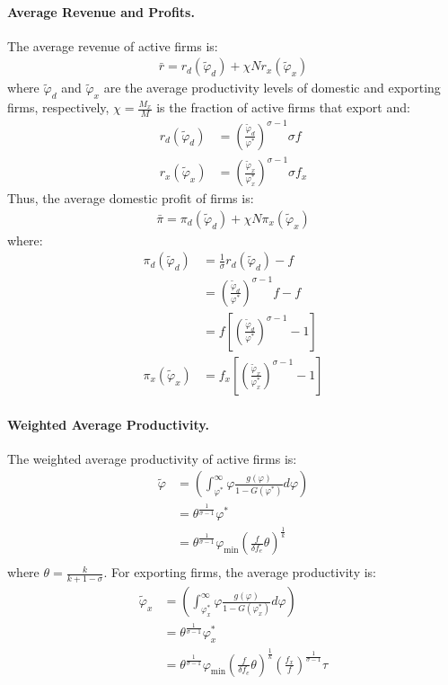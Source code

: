\begin{solution}
	\paragraph{Average Revenue and Profits.} The average revenue of active firms is:
	\begin{align*}
		\bar{r} = r_d(\tilde{\varphi}_d) + \chi N r_x(\tilde{\varphi}_x)
	\end{align*}
	where $\tilde{\varphi}_d$ and $\tilde{\varphi}_x$ are the average productivity levels of domestic and exporting firms, respectively,  $\chi = \frac{M_x}{M}$ is the fraction of active firms that export and:
	\begin{align*}
		r_d(\tilde{\varphi}_d) &= \left(\frac{\tilde{\varphi}_d}{\varphi^*}\right)^{\sigma - 1} \sigma f \\
		r_x(\tilde{\varphi}_x) &= \left(\frac{\tilde{\varphi}_x}{\varphi_x^*}\right)^{\sigma - 1} \sigma f_x
	\end{align*}
	Thus, the average domestic profit of firms is:
	\begin{align*}
		\bar{\pi} = \pi_d(\tilde{\varphi}_d) + \chi N \pi_x(\tilde{\varphi}_x)
	\end{align*}
	where:
	\begin{align*}
		\pi_d(\tilde{\varphi}_d) &= \frac{1}{\sigma} r_d(\tilde{\varphi}_d) - f \\
		&= \left(\frac{\tilde{\varphi}_d}{\varphi^*}\right)^{\sigma - 1} f - f \\
		&= f \left[ \left(\frac{\tilde{\varphi}_d}{\varphi^*}\right)^{\sigma - 1} - 1 \right] \\
		\pi_x(\tilde{\varphi}_x) &= f_x \left[ \left(\frac{\tilde{\varphi}_x}{\varphi_x^*}\right)^{\sigma - 1} - 1 \right]
	\end{align*}

	\paragraph{Weighted Average Productivity.} The weighted average productivity of active firms is:
	\begin{align*}
		\tilde{\varphi} &= \left(\int_{\varphi^*}^{\infty} \varphi \frac{g(\varphi)}{1 - G(\varphi^*)} d\varphi \right) \\
		&= \theta^{\frac{1}{\sigma -1}} \varphi^* \\
		&= \theta^{\frac{1}{\sigma -1}} \varphi_{\min} \left( \frac{f}{\delta f_e} \theta \right)^{\frac{1}{k}} \\
	\end{align*}
	where $\theta = \frac{k}{k+1 - \sigma}$. For exporting firms, the average productivity is:
	\begin{align*}
		\tilde{\varphi}_x &= \left(\int_{\varphi_x^*}^{\infty} \varphi \frac{g(\varphi)}{1 - G(\varphi_x^*)} d\varphi \right) \\
		&= \theta^{\frac{1}{\sigma -1}} \varphi_x^* \\
		&= \theta^{\frac{1}{\sigma -1}} \varphi_{\min} \left( \frac{f}{\delta f_e} \theta \right)^{\frac{1}{k}} \left( \frac{f_x}{f} \right)^{\frac{1}{\sigma - 1}} \tau \\
	\end{align*}
	\end{solution}